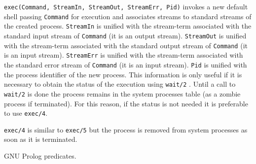 \Description

\texttt{exec(Command, StreamIn, StreamOut, StreamErr, Pid)} invokes a new
default shell passing \texttt{Command} for execution and associates streams
to standard streams of the created process. \texttt{StreamIn} is unified
with the stream-term associated with the standard input stream of
\texttt{Command} (it is an output stream). \texttt{StreamOut} is unified
with the stream-term associated with the standard output stream of
\texttt{Command} (it is an input stream). \texttt{StreamErr} is unified with
the stream-term associated with the standard error stream of \texttt{Command}
(it is an input stream). \texttt{Pid} is unified with the process identifier
of the new process. This information is only useful if it is necessary to
obtain the status of the execution using \texttt{wait/2} .
Until a call to \texttt{wait/2} is done the process remains in the system
processes table (as a zombie process if terminated). For this reason, if the
status is not needed it is preferable to use \texttt{exec/4}.

\texttt{exec/4} is similar to \texttt{exec/5} but the process is removed
from system processes as soon as it is terminated.

\begin{PlErrors}








\end{PlErrors}

\Portability

GNU Prolog predicates.

\subsubsection{}

